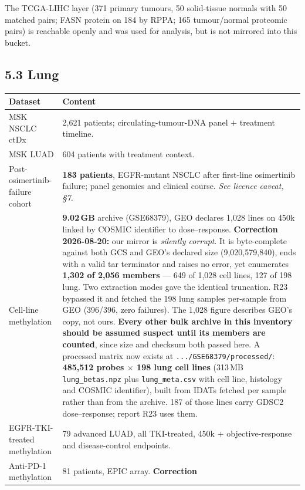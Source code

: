 \documentclass[11pt,a4paper]{article}
\begin{document}
\noindent
The TCGA-LIHC layer (371 primary tumours, 50 solid-tissue normals with 50 matched pairs;
FASN protein on 184 by RPPA; 165 tumour/normal proteomic pairs) is reachable openly and
was used for analysis, but is not mirrored into this bucket.

\subsection*{5.3 Lung}

\begin{center}
\small
\begin{tabular}{@{}p{4.0cm}p{10.4cm}@{}}
\toprule
\textbf{Dataset} & \textbf{Content} \\
\midrule
MSK NSCLC ctDx & 2{,}621 patients; circulating-tumour-DNA panel $+$ treatment timeline. \\
MSK LUAD & 604 patients with treatment context. \\
Post-osimertinib-failure cohort & \textbf{183 patients}, EGFR-mutant NSCLC after
first-line osimertinib failure; panel genomics and clinical course. \emph{See licence
caveat, \S7.} \\
Cell-line methylation & \textbf{9.02\,GB} archive (GSE68379), GEO declares 1{,}028 lines on
450k linked by COSMIC identifier to dose--response. \textcolor{qred}{\textbf{Correction
2026-08-20:} our mirror is \emph{silently corrupt}. It is byte-complete against both GCS and GEO's
declared size (9{,}020{,}579{,}840), ends with a valid tar terminator and raises no error, yet
enumerates \textbf{1{,}302 of 2{,}056 members} --- 649 of 1{,}028 cell lines, 127 of 198 lung. Two
extraction modes gave the identical truncation. R23 bypassed it and fetched the 198 lung samples
per-sample from GEO (396/396, zero failures). The 1{,}028 figure describes GEO's copy, not ours.
\textbf{Every other bulk archive in this inventory should be assumed suspect until its members are
counted}, since size and checksum both passed here. A processed matrix now exists at
\texttt{.../GSE68379/processed/}: \textbf{485{,}512 probes $\times$ 198 lung cell lines}
(313\,MB \texttt{lung\_betas.npz} plus \texttt{lung\_meta.csv} with cell line, histology and COSMIC
identifier), built from IDATs fetched per sample rather than from the archive. 187 of those lines
carry GDSC2 dose--response; report R23 uses them.} \\
EGFR-TKI-treated methylation & 79 advanced LUAD, all TKI-treated, 450k $+$
objective-response and disease-control endpoints. \\
Anti-PD-1 methylation & 81 patients, EPIC array. \textcolor{qred}{\textbf{Correction
}}
\end{tabular}
\end{center}
\end{document}
